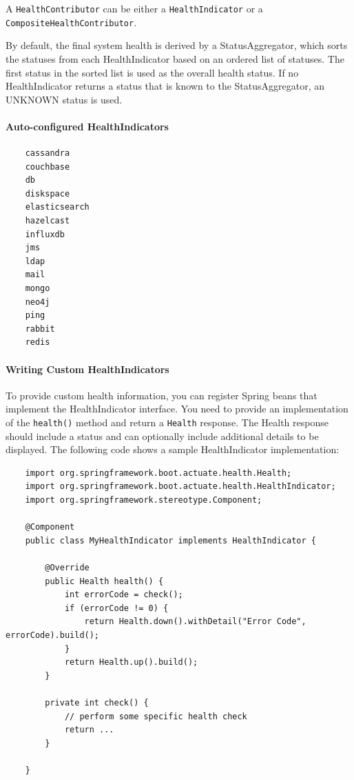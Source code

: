\documentclass{scrartcl}
\begin{document}
A \lstinline|HealthContributor| can be either a \lstinline|HealthIndicator| or a \lstinline|CompositeHealthContributor|.

By default, the final system health is derived by a StatusAggregator, which sorts the statuses from each HealthIndicator based on an ordered list of statuses. The first status in the sorted list is used as the overall health status. If no HealthIndicator returns a status that is known to the StatusAggregator, an UNKNOWN status is used.

\paragraph{Auto-configured HealthIndicators}

\begin{lstlisting}
    cassandra
    couchbase
    db
    diskspace
    elasticsearch
    hazelcast
    influxdb
    jms
    ldap
    mail
    mongo
    neo4j
    ping
    rabbit
    redis
\end{lstlisting}

\paragraph{Writing Custom HealthIndicators}

To provide custom health information, you can register Spring beans that implement the HealthIndicator interface. You need to provide an implementation of the \lstinline|health()| method and return a \lstinline|Health| response. The Health response should include a status and can optionally include additional details to be displayed. The following code shows a sample HealthIndicator implementation:

    \begin{lstlisting}
    import org.springframework.boot.actuate.health.Health;
    import org.springframework.boot.actuate.health.HealthIndicator;
    import org.springframework.stereotype.Component;

    @Component
    public class MyHealthIndicator implements HealthIndicator {

        @Override
        public Health health() {
            int errorCode = check();
            if (errorCode != 0) {
                return Health.down().withDetail("Error Code", errorCode).build();
            }
            return Health.up().build();
        }

        private int check() {
            // perform some specific health check
            return ...
        }

    }
    \end{lstlisting}
\end{document}
